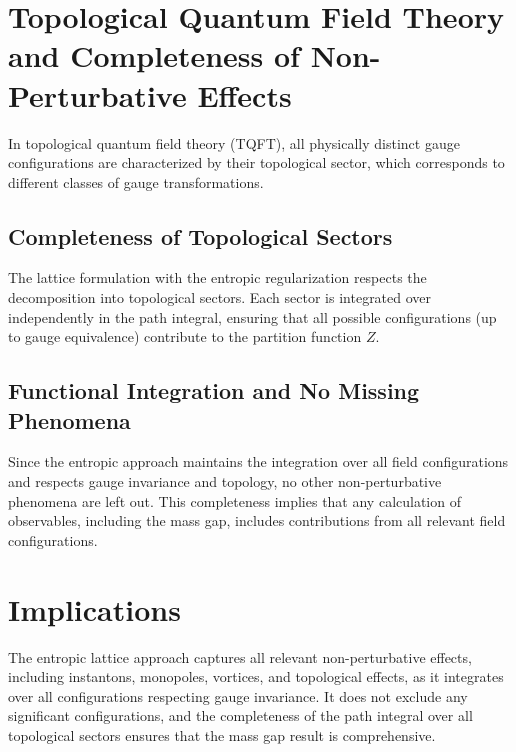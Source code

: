 \section{Topological Quantum Field Theory and Completeness of Non-Perturbative Effects}

In topological quantum field theory (TQFT), all physically distinct gauge configurations are characterized by their topological sector, which corresponds to different classes of gauge transformations.

\subsection{Completeness of Topological Sectors}

The lattice formulation with the entropic regularization respects the decomposition into topological sectors. Each sector is integrated over independently in the path integral, ensuring that all possible configurations (up to gauge equivalence) contribute to the partition function \( Z \).

\subsection{Functional Integration and No Missing Phenomena}

Since the entropic approach maintains the integration over all field configurations and respects gauge invariance and topology, no other non-perturbative phenomena are left out. This completeness implies that any calculation of observables, including the mass gap, includes contributions from all relevant field configurations.



\section{Implications}

The entropic lattice approach captures all relevant non-perturbative effects, including instantons, monopoles, vortices, and topological effects, as it integrates over all configurations respecting gauge invariance. It does not exclude any significant configurations, and the completeness of the path integral over all topological sectors ensures that the mass gap result is comprehensive.
